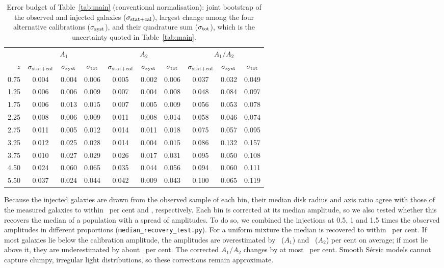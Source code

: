 \documentclass[fleqn,usenatbib]{mnras}
\begin{document}
\begin{table}
\centering
\caption{Error budget of Table~\ref{tab:main} (conventional
normalisation): joint bootstrap of the observed and injected galaxies
($\sigma_{\rm stat+cal}$), largest change among the four alternative
calibrations ($\sigma_{\rm syst}$), and their quadrature sum
($\sigma_{\rm tot}$), which is the uncertainty quoted in
Table~\ref{tab:main}.}
\label{tab:errors}
\small
\begin{tabular}{rccccccccc}
\hline
{} & \multicolumn{3}{c|}{$A_1$} & \multicolumn{3}{c|}{$A_2$} &
\multicolumn{3}{c}{$A_1/A_2$}\\
{$z$} & {$\sigma_{\rm stat+cal}$} &
{$\sigma_{\rm syst}$} & {$\sigma_{\rm tot}$} &
{$\sigma_{\rm stat+cal}$} & {$\sigma_{\rm syst}$} &
{$\sigma_{\rm tot}$} & {$\sigma_{\rm stat+cal}$} &
{$\sigma_{\rm syst}$} & {$\sigma_{\rm tot}$}
\\
\hline
0.75 & 0.004 & 0.004 & 0.006 & 0.005 & 0.002 & 0.006 & 0.037 & 0.032 & 0.049\\
1.25 & 0.006 & 0.006 & 0.009 & 0.007 & 0.004 & 0.008 & 0.048 & 0.084 & 0.097\\
1.75 & 0.006 & 0.013 & 0.015 & 0.007 & 0.005 & 0.009 & 0.056 & 0.053 & 0.078\\
2.25 & 0.008 & 0.006 & 0.009 & 0.011 & 0.008 & 0.014 & 0.058 & 0.046 & 0.074\\
2.75 & 0.011 & 0.005 & 0.012 & 0.014 & 0.011 & 0.018 & 0.075 & 0.057 & 0.095\\
3.25 & 0.012 & 0.025 & 0.028 & 0.014 & 0.004 & 0.015 & 0.086 & 0.132 & 0.157\\
3.75 & 0.010 & 0.027 & 0.029 & 0.026 & 0.017 & 0.031 & 0.095 & 0.050 & 0.108\\
4.50 & 0.024 & 0.060 & 0.065 & 0.035 & 0.044 & 0.056 & 0.094 & 0.060 & 0.111\\
5.50 & 0.037 & 0.024 & 0.044 & 0.042 & 0.009 & 0.043 & 0.100 & 0.065 & 0.119\\
\hline
\end{tabular}
\end{table}

Because the injected galaxies are drawn from the observed sample of each bin,
their median disk radius and axis ratio agree with those of the measured
galaxies to within \numInjRdDev\ per cent and \numInjQDev, respectively. Each bin
is corrected at its median amplitude, so we also tested whether this recovers
the median of a population with a spread of amplitudes. To do so, we combined the
injections at 0.5, 1 and 1.5 times the observed amplitudes in different
proportions (\texttt{median\_recovery\_test.py}). For a uniform mixture the
median is recovered to within \numMedUni\ per cent. If most galaxies lie below
the calibration amplitude, the amplitudes are overestimated by \numMedLowAone\
($A_1$) and \numMedLowAtwo\ ($A_2$) per cent on average; if most lie above it,
they are underestimated by about \numMedHighAone\ per cent. The corrected
$A_1/A_2$ changes by at most \numMedRatio\ per cent. Smooth S\'ersic models
cannot capture clumpy, irregular light distributions, so these corrections remain
approximate.
\end{document}
